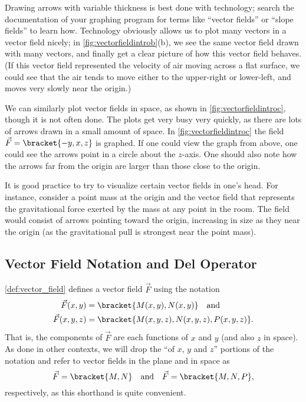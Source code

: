 Drawing arrows with variable thickness is best done with technology; search the documentation of your graphing program for terms like ``vector fields'' or ``slope fields'' to learn how. Technology obviously allows us to plot many vectors in a vector field nicely; in \autoref{fig:vectorfieldintrob}(b), we see the same vector field drawn with many vectors, and finally get a clear picture of how this vector field behaves. (If this vector field represented the velocity of air moving across a flat surface, we could see that the air tends to move either to the upper-right or lower-left, and moves very slowly near the origin.)

We can similarly plot vector fields in space, as shown in \autoref{fig:vectorfieldintroc}, though it is not often done. The plots get very busy very quickly, as there are lots of arrows drawn in a small amount of space. In \autoref{fig:vectorfieldintroc} the field $\vec F =\bracket{-y,x,z}$ is graphed. If one could view the graph from above, one could see the arrows point in a circle about the $z$-axis. One should also note how the arrows far from the origin are larger than those close to the origin. 


It is good practice to try to visualize certain vector fields in one's head. For instance, consider a point mass at the origin and the vector field that represents the gravitational force exerted by the mass at any point in the room. The field would consist of arrows pointing toward the origin, increasing in size as they near the origin (as the gravitational pull is strongest near the point mass).


\subsection{Vector Field Notation and Del Operator}

\autoref{def:vector_field} defines a vector field $\vec F$ using the notation
\begin{align*}
\vec F(x,y) &=\bracket{M(x,y), N(x,y)}
\quad \text{and}\\%
\vec F(x,y,z) &=\bracket{M(x,y,z), N(x,y,z),P(x,y,z)}.
\end{align*}
That is, the components of $\vec F$ are each functions of $x$ and $y$ (and also $z$ in space). As done in other contexts, we will drop the ``of $x$, $y$ and $z$'' portions of the notation and refer to vector fields in the plane and in space as 
\[\vec F =\bracket{M, N}\quad \text{and} \quad \vec F  =\bracket{M,N,P},\]
respectively, as this shorthand is quite convenient.

